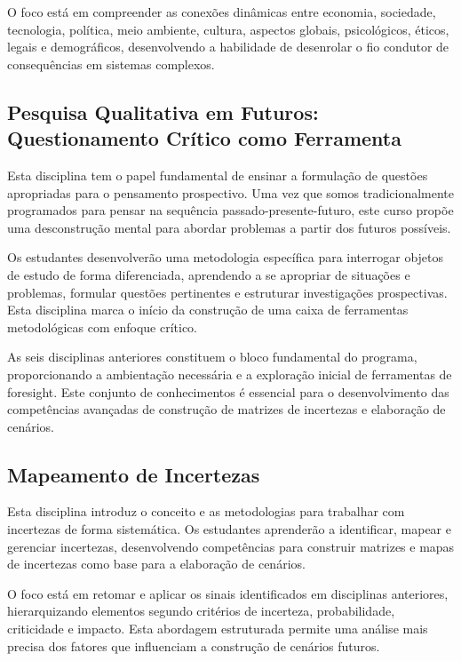 O foco está em compreender as conexões dinâmicas entre economia, sociedade, tecnologia, política, meio ambiente, cultura, aspectos globais, psicológicos, éticos, legais e demográficos, desenvolvendo a habilidade de desenrolar o fio condutor de consequências em sistemas complexos.

\subsection{Pesquisa Qualitativa em Futuros: Questionamento Crítico como Ferramenta}

Esta disciplina tem o papel fundamental de ensinar a formulação de questões apropriadas para o pensamento prospectivo. Uma vez que somos tradicionalmente programados para pensar na sequência passado-presente-futuro, este curso propõe uma desconstrução mental para abordar problemas a partir dos futuros possíveis.

Os estudantes desenvolverão uma metodologia específica para interrogar objetos de estudo de forma diferenciada, aprendendo a se apropriar de situações e problemas, formular questões pertinentes e estruturar investigações prospectivas. Esta disciplina marca o início da construção de uma caixa de ferramentas metodológicas com enfoque crítico.

\begin{keypoint}
As seis disciplinas anteriores constituem o bloco fundamental do programa, proporcionando a ambientação necessária e a exploração inicial de ferramentas de foresight. Este conjunto de conhecimentos é essencial para o desenvolvimento das competências avançadas de construção de matrizes de incertezas e elaboração de cenários.
\end{keypoint}

\subsection{Mapeamento de Incertezas}

Esta disciplina introduz o conceito e as metodologias para trabalhar com incertezas de forma sistemática. Os estudantes aprenderão a identificar, mapear e gerenciar incertezas, desenvolvendo competências para construir matrizes e mapas de incertezas como base para a elaboração de cenários.

O foco está em retomar e aplicar os sinais identificados em disciplinas anteriores, hierarquizando elementos segundo critérios de incerteza, probabilidade, criticidade e impacto. Esta abordagem estruturada permite uma análise mais precisa dos fatores que influenciam a construção de cenários futuros.

